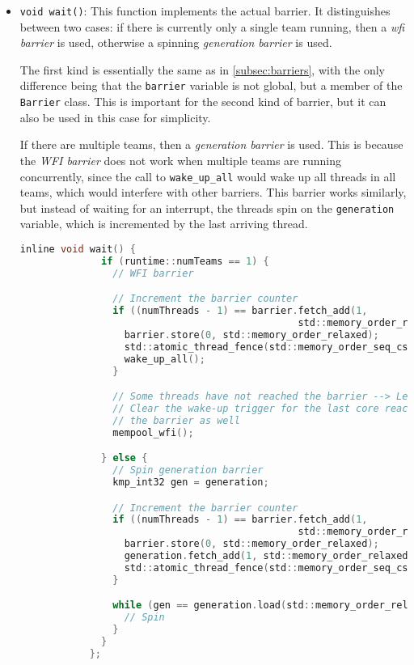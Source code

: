 \begin{itemize}
	\item \texttt{void wait()}: This function implements the actual barrier. It distinguishes
	      between two cases: if there is currently only a single team running, then a
	      \emph{\gls{wfi} barrier} is used, otherwise a spinning \emph{generation barrier} is used.

	      The first kind is essentially the same as in \cref{subsec:barriers}, with the only
	      difference being that the \texttt{barrier} variable is not global, but a member of the
	      \texttt{Barrier} class. This is important for the second kind of barrier, but it can also
	      be used in this case for simplicity.

	      If there are multiple teams, then a \emph{generation barrier} is used. This is because the
	      \emph{WFI barrier} does not work when multiple teams are running concurrently, since the
	      call to \texttt{wake\_up\_all} would wake up all threads in all teams, which would
	      interfere with other barriers. This barrier works similarly, but instead of waiting for an
	      interrupt, the threads spin on the \texttt{generation} variable, which is incremented by
	      the last arriving thread.

	      \begin{lstlisting}[language=C, caption={Barrier::wait}, label={lst:barrier-wait},
          escapechar=@]
            inline void wait() {
              if (runtime::numTeams == 1) {
                // WFI barrier

                // Increment the barrier counter
                if ((numThreads - 1) == barrier.fetch_add(1,
                                                std::memory_order_relaxed)) {
                  barrier.store(0, std::memory_order_relaxed);
                  std::atomic_thread_fence(std::memory_order_seq_cst);
                  wake_up_all();
                }

                // Some threads have not reached the barrier --> Let's wait
                // Clear the wake-up trigger for the last core reaching
                // the barrier as well
                mempool_wfi();

              } else {
                // Spin generation barrier
                kmp_int32 gen = generation;

                // Increment the barrier counter
                if ((numThreads - 1) == barrier.fetch_add(1,
                                                std::memory_order_relaxed)) {
                  barrier.store(0, std::memory_order_relaxed);
                  generation.fetch_add(1, std::memory_order_relaxed);
                  std::atomic_thread_fence(std::memory_order_seq_cst);
                }

                while (gen == generation.load(std::memory_order_relaxed)) {
                  // Spin
                }
              }
            };
          \end{lstlisting}
\end{itemize}

